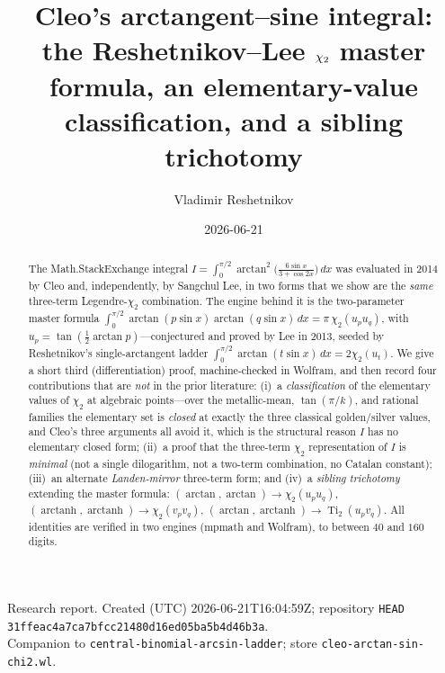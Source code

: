 \documentclass[11pt]{article}
\title{Cleo's arctangent--sine integral:\\
the Reshetnikov--Lee $\chitwo$ master formula, an elementary-value\\ classification, and a sibling trichotomy}
\author{Vladimir Reshetnikov}
\date{2026-06-21}
\DeclareMathOperator{\Ti}{Ti}
\DeclareMathOperator{\arctanh}{arctanh}
\newcommand{\chitwo}{\chi_{2}}
\newcommand{\up}{u_{p}}
\newcommand{\uq}{u_{q}}
\newcommand{\vp}{v_{p}}
\newcommand{\vq}{v_{q}}
\theoremstyle{plain}\newtheorem{theorem}{Theorem}\newtheorem{proposition}[theorem]{Proposition}
\theoremstyle{remark}\newtheorem{remark}[theorem]{Remark}
\begin{document}
\maketitle
\begin{center}\small
Research report. Created (UTC) 2026-06-21T16:04:59Z; repository \texttt{HEAD}
\texttt{31ffeac4a7ca7bfcc21480d16ed05ba5b4d46b3a}.\\
Companion to \texttt{central-binomial-arcsin-ladder}; store \texttt{cleo-arctan-sin-chi2.wl}.
\end{center}

\begin{abstract}
The Math.StackExchange integral $I=\int_0^{\pi/2}\arctan^2\!\bigl(\tfrac{6\sin x}{3+\cos2x}\bigr)\,dx$
was evaluated in 2014 by Cleo and, independently, by Sangchul Lee, in two forms that we show are the
\emph{same} three-term Legendre-$\chitwo$ combination. The engine behind it is the two-parameter master
formula $\int_0^{\pi/2}\arctan(p\sin x)\arctan(q\sin x)\,dx=\pi\,\chitwo(\up\uq)$, with
$\up=\tan(\tfrac12\arctan p)$---conjectured and proved by Lee in 2013, seeded by Reshetnikov's
single-arctangent ladder $\int_0^{\pi/2}\arctan(t\sin x)\,dx=2\chitwo(u_t)$. We give a short third
(differentiation) proof, machine-checked in Wolfram, and then record four contributions that are
\emph{not} in the prior literature: (i)~a \emph{classification} of the elementary values of $\chitwo$ at
algebraic points---over the metallic-mean, $\tan(\pi/k)$, and rational families the elementary set is
\emph{closed} at exactly the three classical golden/silver values, and Cleo's three arguments all avoid
it, which is the structural reason $I$ has no elementary closed form; (ii)~a proof that the three-term
$\chitwo$ representation of $I$ is \emph{minimal} (not a single dilogarithm, not a two-term combination,
no Catalan constant); (iii)~an alternate \emph{Landen-mirror} three-term form; and (iv)~a \emph{sibling
trichotomy} extending the master formula: $(\arctan,\arctan)\!\to\!\chitwo(\up\uq)$,
$(\arctanh,\arctanh)\!\to\!\chitwo(\vp\vq)$, $(\arctan,\arctanh)\!\to\!\Ti_2(\up\vq)$. All identities are
verified in two engines (mpmath and Wolfram), to between $40$ and $160$ digits.
\end{abstract}
\end{document}
